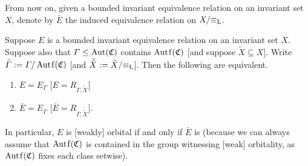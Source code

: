 	From now on, given a bounded invariant equivalence relation on an invariant set $X$, denote by $\bar E$ the induced equivalence relation on $X/{\equiv_{\mathrm{L}}}$.
	\begin{prop}
		\label{prop:orb_to_gal}
		Suppose $E$ is a bounded invariant equivalence relation on an invariant set $X$. Suppose also that $\Gamma\leq \operatorname{{Aut}}({\mathfrak C})$ contains $\Autf(\fC)$ [and suppose $\tilde X\subseteq X$]. Write $\bar{\Gamma}:=\Gamma/\Autf(\fC)$ [and $\bar{\tilde X}:=\tilde X/{\equiv_{\mathrm{L}}}$]. Then the following are equivalent.
		\begin{enumerate}
			\item
			\label{it:prop:orb_to_gal:1}
			$E=E_\Gamma$ [$E=R_{\Gamma,\tilde X}$]
			\item
			\label{it:prop:orb_to_gal:2}
			$\bar E=E_{\bar \Gamma}$ [$\bar E=R_{\bar \Gamma,\bar {\tilde X}}$].
		\end{enumerate}
		In particular, $E$ is [weakly] orbital if and only if $\bar E$ is (because we can always assume that $\Autf(\fC)$ is contained in the group witnessing [weak] orbitality, as $\Autf(\fC)$ fixes each class setwise).
	\end{prop}
